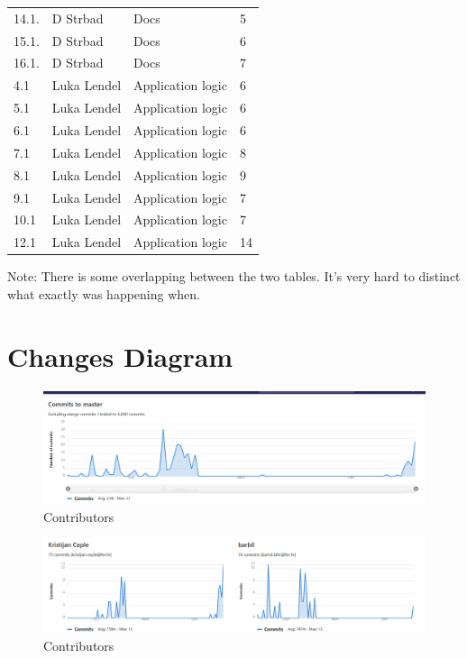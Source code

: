 \begin{longtable}{llll}
			14.1.            & D Strbad                      & Docs                            & 5         \\
			15.1.            & D Strbad                      & Docs                            & 6         \\
			16.1.            & D Strbad                      & Docs                            & 7 \\ 
			4.1  			& Luka Lendel 					& Application logic 					& 6 \\
			5.1  			& Luka Lendel					& Application logic 					& 6 \\
			6.1  			& Luka Lendel 					& Application logic 					& 6 \\
			7.1 			& Luka Lendel 					& Application logic 					& 8 \\
			8.1  			& Luka Lendel 					& Application logic 					& 9 \\
			9.1  			& Luka Lendel 					& Application logic 					& 7 \\
			10.1 			& Luka Lendel 					& Application logic 					& 7 \\
			12.1 			& Luka Lendel 					& Application logic 					& 14 \\     
		\end{longtable}
				
		Note: There is some overlapping between the two tables. It's very hard to distinct what exactly was happening when.
		\eject
		\section*{Changes Diagram}
		
		\begin{figure}[H]
			\includegraphics[width=\linewidth]{images/contribs_1.png}
			\caption{Contributors}
			\label{fig:contribs_1}
		\end{figure}
	
		\begin{figure}[H]
			\includegraphics[width=\linewidth]{images/contribs_2.png}
			\caption{Contributors}
			\label{fig:contribs_2}
		\end{figure}

